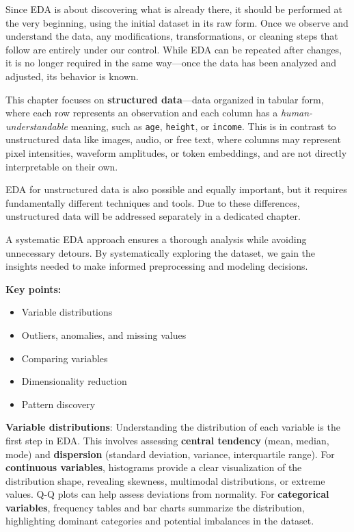 \documentclass[12pt,openany]{book}
\begin{document}
Since EDA is about discovering what is already there, it should be performed 
at the very beginning, using the initial dataset in its raw form. Once we 
observe and understand the data, any modifications, transformations, or 
cleaning steps that follow are entirely under our control. While EDA can be 
repeated after changes, it is no longer required in the same way—once the 
data has been analyzed and adjusted, its behavior is known. \newline

This chapter focuses on \textbf{structured data}—data organized in tabular 
form, where each row represents an observation and each column has a 
\textit{human-understandable} meaning, such as \texttt{age}, \texttt{height}, 
or \texttt{income}. This is in contrast to unstructured data like images, 
audio, or free text, where columns may represent pixel intensities, 
waveform amplitudes, or token embeddings, and are not directly interpretable 
on their own. \newline

EDA for unstructured data is also possible and equally important, but it 
requires fundamentally different techniques and tools. Due to these 
differences, unstructured data will be addressed separately in a dedicated 
chapter. \newline

A systematic EDA approach ensures a thorough analysis while avoiding 
unnecessary detours. By systematically exploring the dataset, we gain the 
insights needed to make informed preprocessing and modeling decisions.
\newline


\textbf{Key points:}
\begin{itemize}
    \item Variable distributions
    \item Outliers, anomalies, and missing values
    \item Comparing variables
    \item Dimensionality reduction
    \item Pattern discovery
\end{itemize}

\textbf{Variable distributions}: Understanding the distribution of each variable is the first step in EDA. This involves assessing \textbf{central tendency} (mean, median, mode) and \textbf{dispersion} (standard deviation, variance, interquartile range). For \textbf{continuous variables}, histograms provide a clear visualization of the distribution shape, revealing skewness, multimodal distributions, or extreme values. Q-Q plots can help assess deviations from normality. For \textbf{categorical variables}, frequency tables and bar charts summarize the distribution, highlighting dominant categories and potential imbalances in the dataset.
\newline
\end{document}
